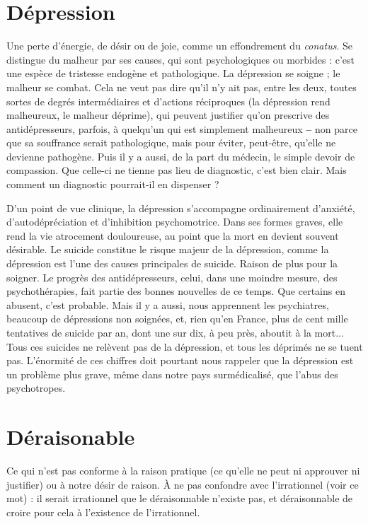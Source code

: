 \section{Dépression}
Une perte d'énergie, de désir ou de joie, comme un effondrement
du {\it conatus}. Se distingue du malheur par ses causes,
qui sont psychologiques ou morbides : c’est une espèce de tristesse endogène et
pathologique. La dépression se soigne ; le malheur se combat. Cela ne veut pas
dire qu’il n’y ait pas, entre les deux, toutes sortes de degrés intermédiaires et
d’actions réciproques (la dépression rend malheureux, le malheur déprime), qui
peuvent justifier qu’on prescrive des antidépresseurs, parfois, à quelqu’un qui
est simplement malheureux {\bf --} non parce que sa souffrance serait pathologique,
mais pour éviter, peut-être, qu’elle ne devienne pathogène. Puis il y a aussi, de
la part du médecin, le simple devoir de compassion. Que celle-ci ne tienne pas
lieu de diagnostic, c’est bien clair. Mais comment un diagnostic pourrait-il en
dispenser ?

D'un point de vue clinique, la dépression s'accompagne ordinairement
d’anxiété, d’autodépréciation et d’inhibition psychomotrice. Dans ses formes
graves, elle rend la vie atrocement douloureuse, au point que la mort en devient
souvent désirable. Le suicide constitue le risque majeur de la dépression,
comme la dépression est l’une des causes principales de suicide. Raison de plus
pour la soigner. Le progrès des antidépresseurs, celui, dans une moindre
mesure, des psychothérapies, fait partie des bonnes nouvelles de ce temps. Que
certains en abusent, c’est probable. Mais il y a aussi, nous apprennent les psychiatres,
beaucoup de dépressions non soignées, et, rien qu’en France, plus de
cent mille tentatives de suicide par an, dont une sur dix, à peu près, aboutit à
la mort... Tous ces suicides ne relèvent pas de la dépression, et tous les
déprimés ne se tuent pas. L’énormité de ces chiffres doit pourtant nous rappeler
que la dépression est un problème plus grave, même dans notre pays surmédicalisé,
que l’abus des psychotropes.

\section{Déraisonable}
Ce qui n’est pas conforme à la raison pratique (ce
qu’elle ne peut ni approuver ni justifier) ou à notre
désir de raison. À ne pas confondre avec l’irrationnel (voir ce mot) : il serait
irrationnel que le déraisonnable n'existe pas, et déraisonnable de croire pour
cela à l’existence de l’irrationnel.


